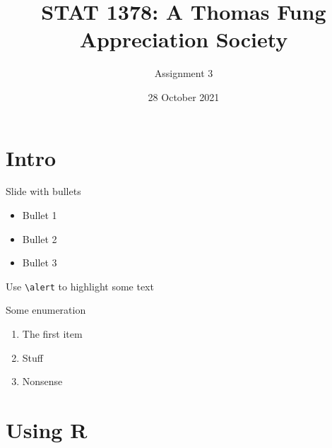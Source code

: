 \documentclass[10pt,ignorenonframetext,aspectratio=169]{beamer}
\title[]{STAT 1378: A Thomas Fung Appreciation Society}
\subtitle{Assignment 3}
\date[
      28 October 2021
  ]{
      28 October 2021
        }
\providecommand{\tightlist}{%
  \setlength{\itemsep}{0pt}\setlength{\parskip}{0pt}}
\begin{document}
  \begin{frame}[plain]
  \titlepage
  \end{frame}



\hypertarget{intro}{%
\section{Intro}\label{intro}}

\begin{frame}[fragile]{Slide with bullets}
\protect\hypertarget{slide-with-bullets}{}
\begin{itemize}[<+->]
\tightlist
\item
  Bullet 1
\item
  Bullet 2
\item
  Bullet 3
\end{itemize}

Use \texttt{\textbackslash{}alert} to \alert{highlight} some text

\begin{block}{Some enumeration}
\protect\hypertarget{some-enumeration}{}
\begin{enumerate}[<+->]
\tightlist
\item
  The first item
\item
  Stuff
\item
  Nonsense
\end{enumerate}
\end{block}
\end{frame}

\hypertarget{using-r}{%
\section{Using R}\label{using-r}}
\end{document}
